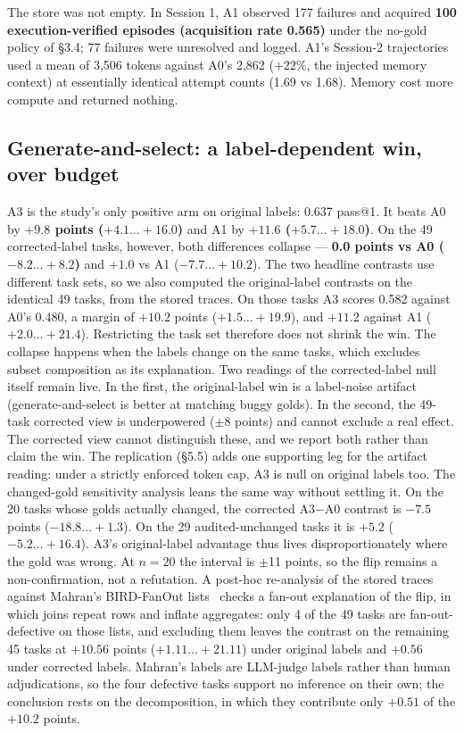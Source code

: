 \documentclass[sigconf, nonacm]{acmart}
\begin{document}
The store was not empty. In Session 1, A1 observed 177 failures and acquired \textbf{100 execution-verified episodes (acquisition rate 0.565)} under the no-gold policy of \S3.4; 77 failures were unresolved and logged. A1's Session-2 trajectories used a mean of 3,506 tokens against A0's 2,862 ($+22\%$, the injected memory context) at essentially identical attempt counts (1.69 vs 1.68). Memory cost more compute and returned nothing.

\subsection{Generate-and-select: a label-dependent win, over budget}

A3 is the study's only positive arm on original labels: 0.637 pass@1. It beats A0 by \textbf{$+9.8$ points ($+4.1\ldots+16.0$)} and A1 by \textbf{$+11.6$ ($+5.7\ldots+18.0$)}. On the 49 corrected-label tasks, however, both differences collapse --- \textbf{0.0 points vs A0 ($-8.2\ldots+8.2$)} and $+1.0$ vs A1 ($-7.7\ldots+10.2$). The two headline contrasts use different task sets, so we also computed the original-label contrasts on the identical 49 tasks, from the stored traces. On those tasks A3 scores 0.582 against A0's 0.480, a margin of $+10.2$ points ($+1.5\ldots+19.9$), and $+11.2$ against A1 ($+2.0\ldots+21.4$). Restricting the task set therefore does not shrink the win. The collapse happens when the labels change on the same tasks, which excludes subset composition as its explanation. Two readings of the corrected-label null itself remain live. In the first, the original-label win is a label-noise artifact (generate-and-select is better at matching buggy golds). In the second, the 49-task corrected view is underpowered ($\pm$8 points) and cannot exclude a real effect. The corrected view cannot distinguish these, and we report both rather than claim the win. The replication (\S5.5) adds one supporting leg for the artifact reading: under a strictly enforced token cap, A3 is null on original labels too. The changed-gold sensitivity analysis leans the same way without settling it. On the 20 tasks whose golds actually changed, the corrected A3$-$A0 contrast is $-7.5$ points ($-18.8\ldots+1.3$). On the 29 audited-unchanged tasks it is $+5.2$ ($-5.2\ldots+16.4$). A3's original-label advantage thus lives disproportionately where the gold was wrong. At $n = 20$ the interval is $\pm$11 points, so the flip remains a non-confirmation, not a refutation. A post-hoc re-analysis of the stored traces against Mahran's BIRD-FanOut lists~\cite{mahran2026fanout} checks a fan-out explanation of the flip, in which joins repeat rows and inflate aggregates: only 4 of the 49 tasks are fan-out-defective on those lists, and excluding them leaves the contrast on the remaining 45 tasks at $+10.56$ points ($+1.11\ldots+21.11$) under original labels and $+0.56$ under corrected labels. Mahran's labels are LLM-judge labels rather than human adjudications, so the four defective tasks support no inference on their own; the conclusion rests on the decomposition, in which they contribute only $+0.51$ of the $+10.2$ points.
\end{document}
